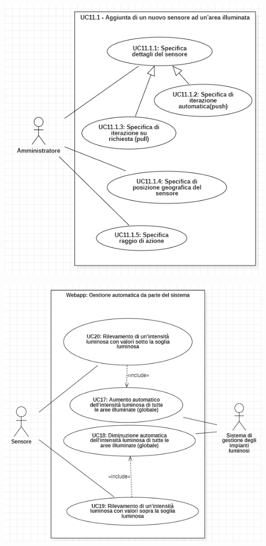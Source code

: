 \documentclass[a4paper, 12pt]{article}
\begin{document}
\includegraphics[scale=0.60]{diagramma_use_case_10.png}

\includegraphics[scale=0.63]{diagramma_use_case_11.png}
\end{document}
